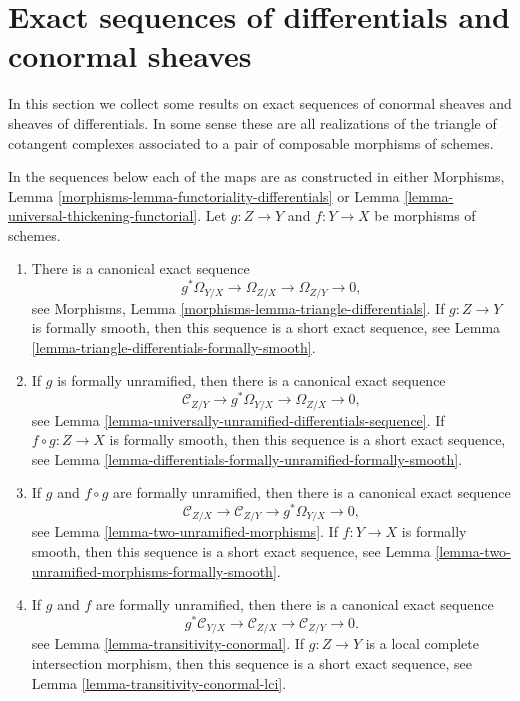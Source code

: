\section{Exact sequences of differentials and conormal sheaves}
\label{section-exact}

\noindent
In this section we collect some results on exact sequences of conormal
sheaves and sheaves of differentials. In some sense these are all
realizations of the triangle of cotangent complexes associated to a pair of
composable morphisms of schemes.

\medskip\noindent
In the sequences below each of the maps
are as constructed in either
Morphisms, Lemma \ref{morphisms-lemma-functoriality-differentials}
or
Lemma \ref{lemma-universal-thickening-functorial}.
Let $g : Z \to Y$ and $f : Y \to X$ be morphisms of schemes.
\begin{enumerate}
\item There is a canonical exact sequence
$$
g^*\Omega_{Y/X} \to \Omega_{Z/X} \to \Omega_{Z/Y} \to 0,
$$
see
Morphisms, Lemma \ref{morphisms-lemma-triangle-differentials}.
If $g : Z \to Y$ is formally smooth, then this sequence is a
short exact sequence, see
Lemma \ref{lemma-triangle-differentials-formally-smooth}.
\item If $g$ is formally unramified, then there is a canonical exact sequence
$$
\mathcal{C}_{Z/Y} \to g^*\Omega_{Y/X} \to \Omega_{Z/X} \to 0,
$$
see
Lemma \ref{lemma-universally-unramified-differentials-sequence}.
If $f \circ g : Z \to X$ is formally smooth, then this sequence is a short
exact sequence, see
Lemma \ref{lemma-differentials-formally-unramified-formally-smooth}.
\item If $g$ and $f \circ g$ are formally unramified, then there is a
canonical exact sequence
$$
\mathcal{C}_{Z/X} \to \mathcal{C}_{Z/Y} \to g^*\Omega_{Y/X} \to 0,
$$
see
Lemma \ref{lemma-two-unramified-morphisms}. If $f : Y \to X$ is formally
smooth, then this sequence is a short exact sequence, see
Lemma \ref{lemma-two-unramified-morphisms-formally-smooth}.
\item If $g$ and $f$ are formally unramified, then there is a canonical
exact sequence
$$
g^*\mathcal{C}_{Y/X} \to \mathcal{C}_{Z/X} \to \mathcal{C}_{Z/Y} \to 0.
$$
see
Lemma \ref{lemma-transitivity-conormal}.
If $g : Z \to Y$ is a local complete intersection morphism, then this
sequence is a short exact sequence, see
Lemma \ref{lemma-transitivity-conormal-lci}.
\end{enumerate}










